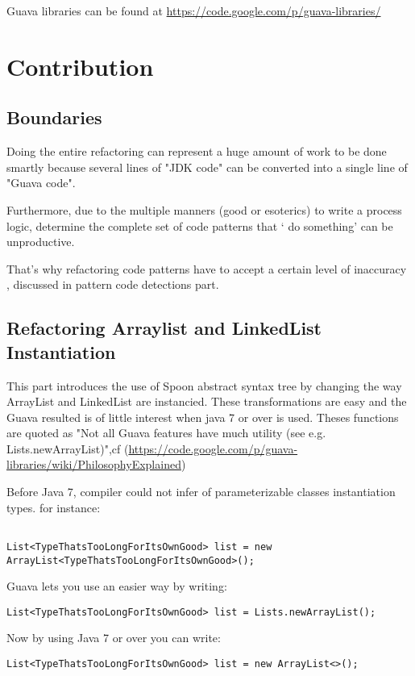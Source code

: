 \documentclass[paper=a4, fontsize=11pt]{scrartcl}
\numberwithin{equation}{section}%
\numberwithin{figure}{section}%
\numberwithin{table}{section}%
\begin{document}
Guava libraries can be found at \url{https://code.google.com/p/guava-libraries/}

\newpage
\section{Contribution}
\subsection{Boundaries}
Doing the entire refactoring can represent a huge amount of work to be
done smartly because several lines of "JDK code" can be converted into
a single line of "Guava code".\newline

Furthermore, due to the multiple manners (good or esoterics) to write
a process logic,  determine the complete set of code patterns that `
do something' can be unproductive. \newline

That's why refactoring code patterns have to accept a certain level of inaccuracy , discussed in
pattern code detections part. 

\subsection{Refactoring Arraylist and LinkedList Instantiation}

This part introduces the use of Spoon abstract syntax tree by changing
the way ArrayList and LinkedList are instancied. These transformations
are easy and the Guava resulted is of little interest when java 7 or
over is used. Theses functions are quoted as "Not all Guava features
have much utility (see e.g. Lists.newArrayList)",cf
(\url{https://code.google.com/p/guava-libraries/wiki/PhilosophyExplained})

Before Java 7, compiler could not infer of parameterizable classes
instantiation types. for instance:
\begin{verbatim}

List<TypeThatsTooLongForItsOwnGood> list = new
ArrayList<TypeThatsTooLongForItsOwnGood>();
\end{verbatim}

Guava lets you use an easier way by writing:
\begin{verbatim}
List<TypeThatsTooLongForItsOwnGood> list = Lists.newArrayList();
\end{verbatim}

Now by using Java 7 or over you can write:
\begin{verbatim}
List<TypeThatsTooLongForItsOwnGood> list = new ArrayList<>();
\end{verbatim}
\end{document}
